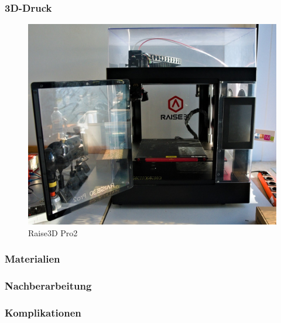 \documentclass[11pt]{article}
\begin{document}
\subsubsection{3D-Druck}
\begingroup
\begin{figure}
\centering
  {\setlength{\belowcaptionskip}{-0pt}
    \includegraphics[width=\linewidth]{Drucker.jpg}
    \caption{Raise3D Pro2}
  }
\end{figure}
\Druck

\endgroup

\subsubsection{Materialien}
\Materialien

\subsubsection{Nachberarbeitung}
\Nachbearbeitung

\subsubsection{Komplikationen}
\Komplikationen

\end{document}
